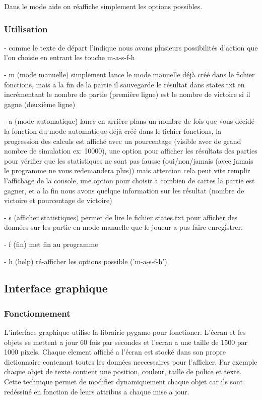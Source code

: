 \documentclass{scrartcl}
\newcommand{\ts}[1]{{\fontfamily{pcr}\selectfont #1}}
\begin{document}
Dans le mode aide on réaffiche simplement les options possibles.

\subsubsection{Utilisation}

- comme le texte de départ l'indique nous avons plusieurs possibilités d'action que l'on choisie en entrant les touche \ts{m-a-s-f-h}

- \ts{m} (mode manuelle) simplement lance le mode manuelle déjà créé dans le fichier fonctions, mais a la fin de la partie il sauvegarde le résultat dans \ts{states.txt} en incrémentant le nombre de partie (première ligne) est le nombre de victoire si il gagne (deuxième ligne)

- \ts{a} (mode automatique) lance en arrière plans un nombre de fois que vous décidé la fonction du mode automatique déjà créé dans le fichier fonctions, la progression des calculs est affiché avec un pourcentage (visible avec de grand nombre de simulation ex: 10000), une option pour afficher les résultats des parties pour vérifier que les statistiques ne sont pas fausse (oui/non/jamais (avec jamais le programme ne vous redemandera plus)) mais attention cela peut vite remplir l'affichage de la console, une option pour choisir a combien de cartes la partie est gagner, et a la fin nous avons quelque information sur les résultat (nombre de victoire et pourcentage de victoire)

- \ts{s} (afficher statistiques) permet de lire le fichier \ts{states.txt} pour afficher des données sur les partie en mode manuelle que le joueur a pus faire enregistrer.

- \ts{f} (fin) met fin au programme

- \ts{h} (help) ré-afficher les options possible ('m-a-s-f-h')


\subsection{Interface graphique}\label{subsec:IG}
\subsubsection{Fonctionnement}
L'interface graphique utilise la librairie pygame pour fonctioner.
L'écran et les objets se mettent a jour 60 fois par secondes et l'ecran a une taille de 1500 par 1000 pixels. 
Chaque element affiché a l'écran est stocké dans son propre dictionnaire contenant toutes les données neccessaires pour l'afficher. 
Par exemple chaque objet de texte contient une position, couleur, taille de police et texte. 
Cette technique permet de modifier dynamiquement chaque objet car ils sont redéssiné en fonction de leurs attribus a chaque mise a jour.
  
\end{document}
